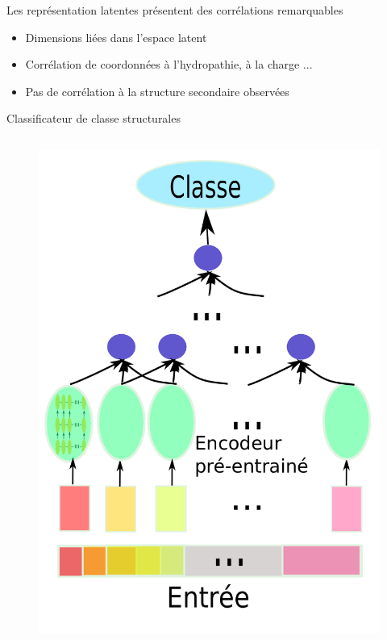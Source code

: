 \documentclass{beamer}
\begin{document}
\begin{frame}{Les représentation latentes présentent des corrélations remarquables}
    \begin{itemize}
    \item Dimensions liées dans l'espace latent\pause
    \item Corrélation de coordonnées à l'hydropathie, à la charge ...\pause
    \item Pas de corrélation à la structure secondaire observées
    \end{itemize}
  

\end{frame}


\begin{frame}{Classificateur de classe structurales}

  \begin{columns}
    \begin{figure}
      \centering
      \includegraphics[scale=0.16]{../Figures/Classd}
    \end{figure}


\end{columns}
\end{frame}
\end{document}
